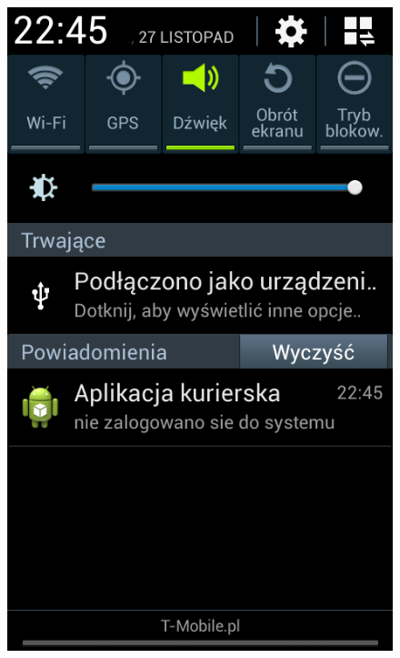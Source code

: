 \documentclass[eng,printmode,oneside]{mgr}
\begin{document}
\begin{figure}
{\includegraphics[height=0.35\textheight]{andBarNie.png}
}
\end{figure}
\end{document}
